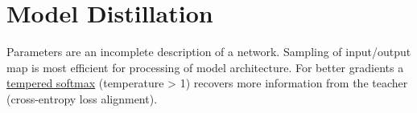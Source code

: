 \section*{Model Distillation}
Parameters are an incomplete description of a network. Sampling of input/output map is most efficient for processing of model architecture. For better gradients a \underline{tempered softmax} (temperature > 1) recovers more information from the teacher (cross-entropy loss alignment).

\color{red}
